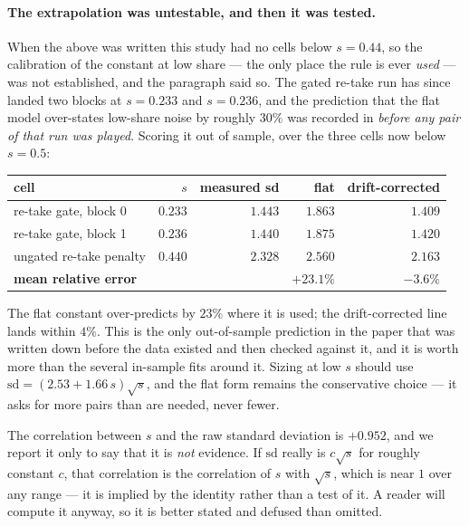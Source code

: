 \documentclass[11pt,a4paper]{article}
\begin{document}
\paragraph{The extrapolation was untestable, and then it was tested.} When the
above was written this study had no cells below $s = 0.44$, so the calibration
of the constant at low share --- the only place the rule is ever \emph{used} ---
was not established, and the paragraph said so. The gated re-take run has since
landed two blocks at $s = 0.233$ and $s = 0.236$, and the prediction that the
flat model over-states low-share noise by roughly $30\%$ was recorded in
 \emph{before any pair of that run
was played}. Scoring it out of sample, over the three cells now below $s = 0.5$:
\begin{center}
\begin{tabular}{lrrrr}
\toprule
cell & $s$ & measured sd & flat & drift-corrected \\
\midrule
re-take gate, block 0 & $0.233$ & $1.443$ & $1.863$ & $1.409$ \\
re-take gate, block 1 & $0.236$ & $1.440$ & $1.875$ & $1.420$ \\
ungated re-take penalty & $0.440$ & $2.328$ & $2.560$ & $2.163$ \\
\midrule
\multicolumn{2}{l}{\textbf{mean relative error}} & &
  $\mathbf{+23.1\%}$ & $\mathbf{-3.6\%}$ \\
\bottomrule
\end{tabular}
\end{center}
The flat constant over-predicts by $23\%$ where it is used; the drift-corrected
line lands within $4\%$. This is the only out-of-sample prediction in the paper
that was written down before the data existed and then checked against it, and
it is worth more than the several in-sample fits around it. Sizing at low $s$
should use $\mathrm{sd} = (2.53 + 1.66\,s)\sqrt{s}$, and the flat form remains
the conservative choice --- it asks for more pairs than are needed, never
fewer.

The correlation between $s$ and the raw standard deviation is $+0.952$, and we
report it only to say that it is \emph{not} evidence. If $\mathrm{sd}$ really is
$c\sqrt{s}$ for roughly constant $c$, that correlation is the correlation of $s$
with $\sqrt{s}$, which is near $1$ over any range --- it is implied by the
identity rather than a test of it. A reader will compute it anyway, so it is
better stated and defused than omitted.
\end{document}

